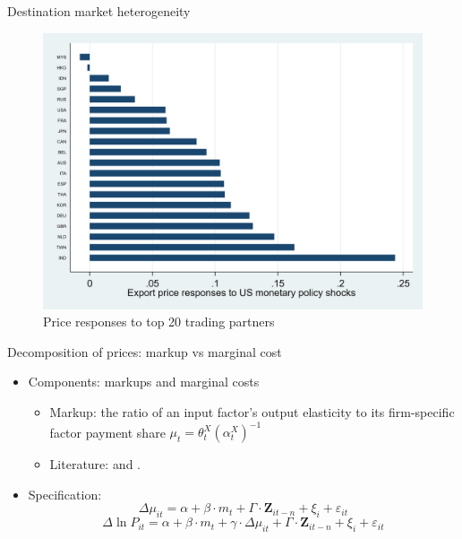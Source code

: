 \documentclass[10pt]{beamer}
\begin{document}
\begin{frame}{Destination market heterogeneity}
    \begin{figure}[htbp]
        \label{fig.top20}
	\centering
	\includegraphics[width=0.85\columnwidth]{latex/slides/pic_Dec2023/brw_month_country_20.png}
        \caption{Price responses to top 20 trading partners}
    \end{figure}
    \hyperlink{robustness_other}{}
\end{frame}

\begin{frame}[label=Price_Decomposition]{Decomposition of prices: markup vs marginal cost}
    \begin{itemize}
        \item Components: markups and marginal costs
        \begin{itemize}
            \item Markup: the ratio of an input factor's output elasticity to its firm-specific factor payment share $\mu_{t}=\theta_{t}^{X}\left(\alpha_{t}^{X}\right)^{-1}$
            \item Literature: \cite{deloecker2012markups} and \cite{brooks2021agglomeration}.
        \end{itemize}
        \item Specification: 
        \begin{equation}
            \Delta \mu_{it} = \alpha +\beta \cdot m_{t}+ \Gamma \cdot \textbf{Z}_{it-n}+\xi_{i}+\varepsilon_{it} \label{reg.markup}
        \end{equation}
        \begin{equation}
            \Delta \ln P_{it} = \alpha+\beta \cdot m_{t}+ \gamma \cdot \Delta \mu_{it}+ \Gamma \cdot \textbf{Z}_{it-n}+\xi_{i}+\varepsilon_{i t} \label{reg.markup_int}
        \end{equation}
    \end{itemize}
\end{frame}
\end{document}
